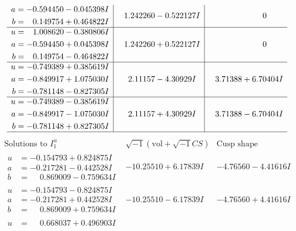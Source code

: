 \documentclass[1p]{elsarticle_modified}
\theoremstyle{definition}
\newcommand{\I}{\sqrt{-1}}
\begin{document}
$$\begin{array}{c|c|c}
\begin{aligned}
a &= -0.594450 - 0.045398 I \\
b &= \phantom{-}0.149754 + 0.464822 I\end{aligned}
 & \phantom{-}1.242260 - 0.522127 I & \phantom{-0.000000 } 0 \\ \hline\begin{aligned}
u &= \phantom{-}1.008620 - 0.380806 I \\
a &= -0.594450 + 0.045398 I \\
b &= \phantom{-}0.149754 - 0.464822 I\end{aligned}
 & \phantom{-}1.242260 + 0.522127 I & \phantom{-0.000000 } 0 \\ \hline\begin{aligned}
u &= -0.749389 + 0.385619 I \\
a &= -0.849917 + 1.075030 I \\
b &= -0.781148 - 0.827305 I\end{aligned}
 & \phantom{-}2.11157 - 4.30929 I & \phantom{-}3.71388 + 6.70404 I \\ \hline\begin{aligned}
u &= -0.749389 - 0.385619 I \\
a &= -0.849917 - 1.075030 I \\
b &= -0.781148 + 0.827305 I\end{aligned}
 & \phantom{-}2.11157 + 4.30929 I & \phantom{-}3.71388 - 6.70404 I\\
 \hline 
 \end{array}$$\newpage$$\begin{array}{c|c|c}  
\text{Solutions to }I^u_{1}& \I (\text{vol} + \sqrt{-1}CS) & \text{Cusp shape}\\
 \hline 
\begin{aligned}
u &= -0.154793 + 0.824875 I \\
a &= -0.217281 - 0.442528 I \\
b &= \phantom{-}0.869009 - 0.759634 I\end{aligned}
 & -10.25510 + 6.17839 I & -4.76560 - 4.41616 I \\ \hline\begin{aligned}
u &= -0.154793 - 0.824875 I \\
a &= -0.217281 + 0.442528 I \\
b &= \phantom{-}0.869009 + 0.759634 I\end{aligned}
 & -10.25510 - 6.17839 I & -4.76560 + 4.41616 I \\ \hline\begin{aligned}
u &= \phantom{-}0.668037 + 0.496903 I \\

\end{aligned}
\end{array}$$
\end{document}
